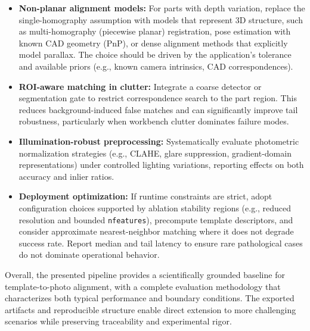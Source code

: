 \begin{itemize}
  \item \textbf{Non-planar alignment models:} For parts with depth variation, replace the single-homography assumption with models that represent 3D structure, such as multi-homography (piecewise planar) registration, pose estimation with known CAD geometry (PnP), or dense alignment methods that explicitly model parallax. The choice should be driven by the application's tolerance and available priors (e.g., known camera intrinsics, CAD correspondences).
  \item \textbf{ROI-aware matching in clutter:} Integrate a coarse detector or segmentation gate to restrict correspondence search to the part region. This reduces background-induced false matches and can significantly improve tail robustness, particularly when workbench clutter dominates failure modes.
  \item \textbf{Illumination-robust preprocessing:} Systematically evaluate photometric normalization strategies (e.g., CLAHE, glare suppression, gradient-domain representations) under controlled lighting variations, reporting effects on both accuracy and inlier ratios.
  \item \textbf{Deployment optimization:} If runtime constraints are strict, adopt configuration choices supported by ablation stability regions (e.g., reduced resolution and bounded \texttt{nfeatures}), precompute template descriptors, and consider approximate nearest-neighbor matching where it does not degrade success rate. Report median and tail latency to ensure rare pathological cases do not dominate operational behavior.
\end{itemize}

Overall, the presented pipeline provides a scientifically grounded baseline for template-to-photo alignment, with a complete evaluation methodology that characterizes both typical performance and boundary conditions. The exported artifacts and reproducible structure enable direct extension to more challenging scenarios while preserving traceability and experimental rigor.

